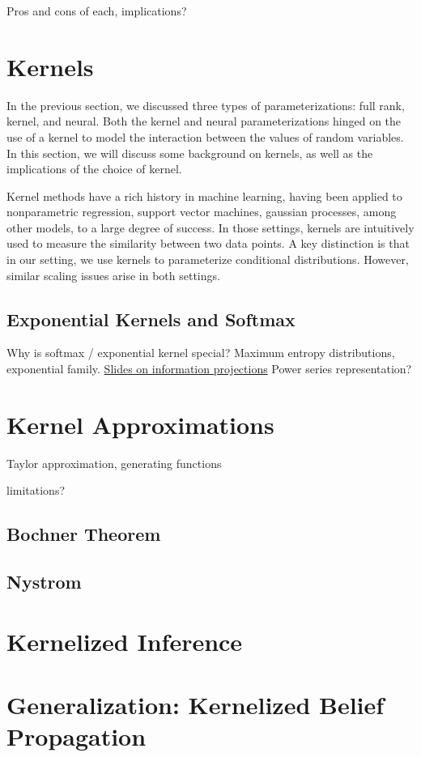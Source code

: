\documentclass{article}
\begin{document}
Pros and cons of each, implications?

\section{Kernels}
In the previous section, we discussed three types of parameterizations: full rank,
kernel, and neural. Both the kernel and neural parameterizations hinged on the use of
a kernel to model the interaction between the values of random variables.
In this section, we will discuss some background on kernels, as well as
the implications of the choice of kernel.

Kernel methods have a rich history in machine learning,
having been applied to nonparametric regression, support vector machines, gaussian processes,
among other models, to a large degree of success.
In those settings, kernels are intuitively used to measure the similarity between two data points.
A key distinction is that in our setting,
we use kernels to parameterize conditional distributions.
However, similar scaling issues arise in both settings.

\subsection{Exponential Kernels and Softmax}
Why is softmax / exponential kernel special?
Maximum entropy distributions, exponential family.
\href{https://www.lix.polytechnique.fr/~nielsen/CIG-slides.pdf}{Slides on information projections}
Power series representation?

\section{Kernel Approximations}
Taylor approximation, generating functions

limitations?
\subsection{Bochner Theorem}
\subsection{Nystrom}

\section{Kernelized Inference}

\section{Generalization: Kernelized Belief Propagation}
\end{document}
